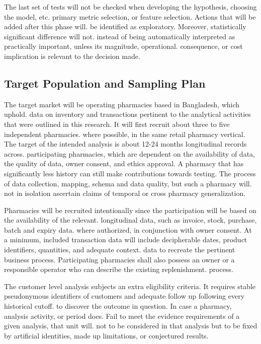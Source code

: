 \documentclass[a4paper,11pt,oneside]{book}
\theoremstyle{plain}
\theoremstyle{definition}
\theoremstyle{remark}
\begin{document}
The last set of tests will not be checked when developing the hypothesis, choosing the model, etc. primary metric selection, or feature selection. Actions that will be added after this phase will. be identified as exploratory. Moreover, statistically significant difference will not. instead of being automatically interpreted as practically important, unless its magnitude, operational. consequence, or cost implication is relevant to the decision made.

\subsection{Target Population and Sampling Plan}

The target market will be operating pharmacies based in Bangladesh, which uphold. data on inventory and transactions pertinent to the analytical activities that were outlined in this research. It will first recruit about three to five independent pharmacies. where possible, in the same retail pharmacy vertical. The target of the intended analysis is about 12-24 months longitudinal records across. participating pharmacies, which are dependent on the availability of data, the quality of data, owner consent, and ethics approval. A pharmacy that has significantly less history can still make contributions towards testing. The process of data collection, mapping, schema and data quality, but such a pharmacy will. not in isolation ascertain claims of temporal or cross pharmacy generalization.

Pharmacies will be recruited intentionally since the participation will be based on the availability of the relevant. longitudinal data, such as invoice, stock, purchase, batch and expiry data. where authorized, in conjunction with owner consent. At a minimum, included transaction data will include decipherable dates, product identifiers, quantities, and adequate context. data to recreate the pertinent business process. Participating pharmacies shall also possess an owner or a responsible operator who can describe the existing replenishment. process.

The customer level analysis subjects an extra eligibility criteria. It requires stable pseudonymous identifiers of customers and adequate follow up following every historical cutoff. to discover the outcome in question. In case a pharmacy, analysis activity, or period does. Fail to meet the evidence requirements of a given analysis, that unit will. not to be considered in that analysis but to be fixed by artificial identities, made up limitations, or conjectured results.
\end{document}
